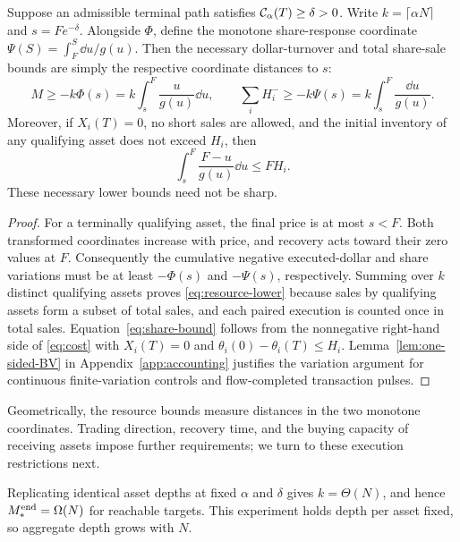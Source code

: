 \documentclass[review,hidelinks,onefignum,onetabnum]{siamonline250211}
\begin{document}
\begin{theorem}\label{thm:resource}
Suppose an admissible terminal path satisfies $\mathcal{C}_\alpha(T)\ge\delta>0$. Write $k=\lceil\alpha N\rceil$ and $s=Fe^{-\delta}$. Alongside $\Phi$, define the monotone share-response coordinate $\Psi(S)=\int_F^S\dd u/g(u)$. Then the necessary dollar-turnover and total share-sale bounds are simply the respective coordinate distances to $s$:
\begin{equation}\label{eq:resource-lower}
M\ge -k\Phi(s)=k\int_s^F\frac{u}{g(u)}\dd u,\qquad
\sum_iH_i^-\ge -k\Psi(s)=k\int_s^F\frac{\dd u}{g(u)}.
\end{equation}
Moreover, if $X_i(T)=0$, no short sales are allowed, and the initial inventory of any qualifying asset does not exceed $H_i$, then
\begin{equation}\label{eq:share-bound}
\int_s^F\frac{F-u}{g(u)}\dd u\le FH_i.
\end{equation}
These necessary lower bounds need not be sharp.
\end{theorem}
\begin{proof}
For a terminally qualifying asset, the final price is at most $s<F$. Both transformed coordinates increase with price, and recovery acts toward their zero values at $F$. Consequently the cumulative negative executed-dollar and share variations must be at least $-\Phi(s)$ and $-\Psi(s)$, respectively. Summing over $k$ distinct qualifying assets proves \eqref{eq:resource-lower} because sales by qualifying assets form a subset of total sales, and each paired execution is counted once in total sales. Equation~\eqref{eq:share-bound} follows from the nonnegative right-hand side of \eqref{eq:cost} with $X_i(T)=0$ and $\theta_i(0)-\theta_i(T)\le H_i$. Lemma~\ref{lem:one-sided-BV} in Appendix~\ref{app:accounting}
justifies the variation argument for continuous finite-variation
controls and flow-completed transaction pulses.
\end{proof}

Geometrically, the resource bounds measure distances in the two monotone coordinates. Trading direction, recovery time, and the buying capacity of receiving assets impose further requirements; we turn to these execution restrictions next.

Replicating identical asset depths at fixed $\alpha$ and $\delta$ gives $k=\Theta(N)$, and hence $M_*^{\rm end}=\Omega(N)$ for reachable targets. This experiment holds depth per asset fixed, so aggregate depth grows with $N$.
\end{document}
